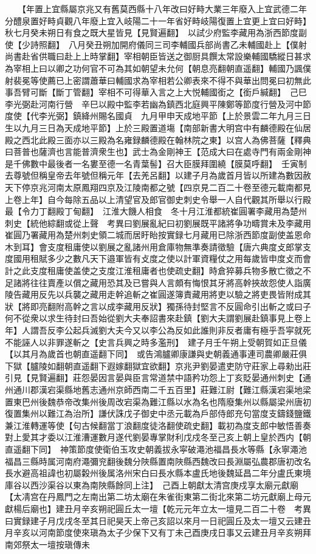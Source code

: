 　　【年置上宜縣屬京兆又有舊莫西縣十八年改曰好畤大業三年廢入上宜武德二年分醴泉置好畤貞觀八年廢上宜入岐陽二十一年省好畤岐陽復置上宜更上宜曰好畤】　秋七月癸未朔日有食之既大星皆見【見賢遍翻】　以試少府監李藏用為浙西節度副使【少詩照翻】　八月癸丑朔加開府儀同三司李輔國兵部尚書乙未輔國赴上【僕射尚書赴省供職曰赴上上時掌翻】宰相朝臣皆送之御厨具饌太常設樂輔國驕縱日甚求為宰相上曰以卿之功何官不可為其如朝望未允何【朝息亮翻朝直遥翻】輔國乃諷僕射裴冕等使薦已上密謂蕭華曰輔國求為宰相若公卿表來不得不與華出問冕曰初無此事吾臂可斷【斷丁管翻】宰相不可得華入言之上大悦輔國銜之【銜戶緘翻】　己巳李光弼赴河南行營　辛巳以殿中監李若幽為鎮西北庭興平陳鄭等節度行營及河中節度使【代李光弼】鎮絳州賜名國貞　九月甲申天成地平節【上於景雲二年九月三日生以九月三日為天成地平節】上於三殿置道塲【南部新書大明宫中有麟德殿在仙居殿之西北此殿三面亦以三殿為名雍録麟德殿在翰林院之東】以宫人為佛菩薩【釋典曰菩普也薩濟也言能普濟衆生也】武士為金剛神王【范成大曰在處寺門有兩金剛神是千佛數中最後者一名婁至德一名青葉髻】召大臣膜拜圍繞【膜莫呼翻】　壬寅制去尊號但稱皇帝去年號但稱元年【去羌呂翻】以建子月為歲首月皆以所建為數因赦天下停京兆河南太原鳳翔四京及江陵南都之號【四京見二百二十卷至德元載南都見上卷上年】自今每除五品以上清望官及郎官御史刺史令舉一人自代觀其所舉以行殿最【令力丁翻殿丁甸翻】　江淮大饑人相食　冬十月江淮都統崔圓署李藏用為楚州刺史【統他綜翻或從上聲　考異曰劉展亂紀曰初劉展既平諸將争功疇賞未及李藏用崔圓乃署藏用為楚州刺史領二城而居盱眙按實録七月藏用已除浙西節度副使盖恩命木到耳】會支度租庸使以劉展之亂諸州用倉庫物無準奏請徵驗【唐六典度攴郎掌支度國用租賦多少之數凡天下邉軍皆有攴度之使以計軍資糧仗之用每歲皆申度攴而會計之此支度租庸使盖使之支度江淮租庸者也使疏史翻】時倉猝募兵物多散亡徵之不足諸將往往賣產以償之藏用恐其及已嘗與人言頗有悔恨其牙將高幹挾故怨使人詣廣陵告藏用反先以兵襲之藏用走幹追斬之崔圓遂簿責藏用將吏以驗之將吏畏皆附成其狀【將即亮翻附高幹之言以成李藏用反狀】獨孫待封堅言不反圓命引出斬之或曰子何不從衆以求生待封曰吾始從劉大夫奉詔書來赴鎮【劉大夫謂劉展赴鎮事見上卷上年】人謂吾反李公起兵滅劉大夫今又以李公為反如此誰則非反者庸有極乎吾寜就死不能誣人以非罪遂斬之【史言兵興之時多濫刑】　建子月壬午朔上受朝賀如正旦儀【以其月為歲首也朝直遥翻下同】　或告鴻臚卿康謙與史朝義通事連司農卿嚴莊俱下獄【臚陵如翻朝直遥翻下遐嫁翻獄宜欲翻】京兆尹劉晏遣吏防守莊家上尋勑出莊引見【見賢遍翻】莊怨晏因言晏與臣言常道禁中語矜功怨上丁亥貶晏通州刺史【通州通川郡漢宕渠縣地舊志通州京師西南二千五百里】莊難江尉【難江縣漢宕渠地梁置東巴州後魏恭帝改集州後周改宕渠為難江縣以水為名也隋廢集州以縣屬梁州唐初復置集州以難江為治所】謙伏誅戊子御史中丞元載為戶部侍郎充句當度支鑄錢鹽鐵兼江淮轉運等使【句古候翻當丁浪翻度徒洛翻使疏史翻】載初為度支郎中敏悟善奏對上愛其才委以江淮漕運數月遂代劉晏專掌財利戊戍冬至己亥上朝上皇於西内【朝直遥翻下同】　神策節度使衛伯玉攻史朝義拔永寜破澠池福昌長水等縣【永寧澠池福昌三縣時属河南府澠彌兖翻後魏分陜縣置南陜縣西魏改曰長淵屬弘農郡唐初改名長水避高祖諱也初屬糓州後属洛州宋白曰長水縣本盧氏地後魏延昌二年分盧氏東境庫谷以西沙渠谷以東為南陜縣餘同上注】　己酉上朝獻太清宫庚戍享太廟元獻廟【太凊宫在丹鳳門之左南出第二坊太廟在朱雀街東第二街北來第二坊元獻廟上母元獻楊后廟也】建丑月辛亥朔祀圓丘太一壇【乾元元年立太一壇見二百二十卷　考異曰實録建子月戊戌冬至其日祀昊天上帝己亥詔以來月一日祀圓丘及太一壇又云建丑月辛亥以河南節度使來瑱為太子少保下又有丁未己酉庚戌日事又云建丑月辛亥朔拜南郊祭太一壇按瑱傳未